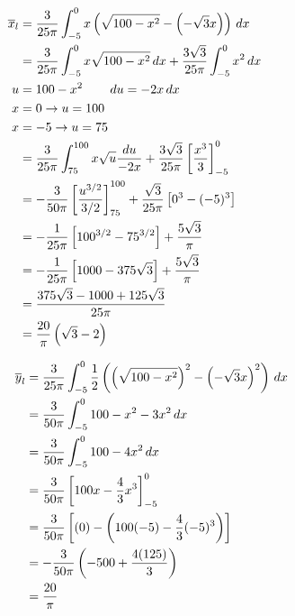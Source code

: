 \documentclass[12pt]{amsart}
\begin{document}
\begin{multicols}{2}
\hspace{-.25in}\begin{align*}
\overline{x}_l & = \frac{3}{25\pi}\int_{-5}^0 x\left(\sqrt{100 - x^2} - \left(-\sqrt{3}x\right)\right)\,dx \hspace{.25in}\\
& = \frac{3}{25\pi}\int_{-5}^0x\sqrt{100-x^2}\,dx + \frac{3\sqrt{3}}{25\pi}\int_{-5}^0 x^2\,dx\\
u & = 100 - x^2 \hspace{.3in} du = -2x\,dx\\
x & = 0 \rightarrow u = 100\\
x & = -5 \rightarrow u = 75\\
& = \frac{3}{25\pi}\int_{75}^{100} x\sqrt{u}\frac{du}{-2x} + \frac{3\sqrt{3}}{25\pi}\left[\frac{x^3}{3}\right]_{-5}^0\\
& = -\frac{3}{50\pi}\left[\frac{u^{3/2}}{3/2}\right]_{75}^{100} + \frac{\sqrt{3}}{25\pi}\left[0^3 - (-5)^3\right]\\
& = -\frac{1}{25\pi}\left[100^{3/2} - 75^{3/2}\right] + \frac{5\sqrt{3}}{\pi}\\
& = -\frac{1}{25\pi}\left[1000 - 375\sqrt{3}\right] + \frac{5\sqrt{3}}{\pi}\\
& = \frac{375\sqrt{3} - 1000 + 125\sqrt{3}}{25\pi}\\
& = \frac{20}{\pi}\left(\sqrt{3} - 2\right)
\end{align*}

\columnbreak

\begin{align*}
\hspace{.25in}\overline{y}_l& = \frac{3}{25\pi}\int_{-5}^0 \frac{1}{2}\left(\left(\sqrt{100 - x^2}\right)^2 - \left(-\sqrt{3}x\right)^2\right)\,dx\\
& = \frac{3}{50\pi}\int_{-5}^0 100 - x^2 - 3x^2\,dx\\
& = \frac{3}{50\pi}\int_{-5}^0 100 - 4x^2\,dx\\
& = \frac{3}{50\pi}\left[100x - \frac{4}{3}x^3\right]_{-5}^0\\
& = \frac{3}{50\pi}\left[(0) - \left(100(-5) - \frac{4}{3}(-5)^3\right)\right]\\
& = -\frac{3}{50\pi}\left(-500 + \frac{4(125)}{3}\right)\\
& = \frac{20}{\pi}
\end{align*}

\end{multicols}
\end{document}
